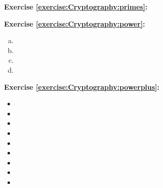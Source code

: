 \noindent\textbf{Exercise \ref{exercise:Cryptography:primes}:}

\noindent\textbf{Exercise \ref{exercise:Cryptography:power}:}
\begin{enumerate}[(a)]
\item
\item  
\item 
\item 
\end{enumerate}

\noindent\textbf{Exercise \ref{exercise:Cryptography:powerplus}:}
\begin{itemize}
\item
\item
\item
\item
\item
\item
\item
\item
\item
\end{itemize}
%

